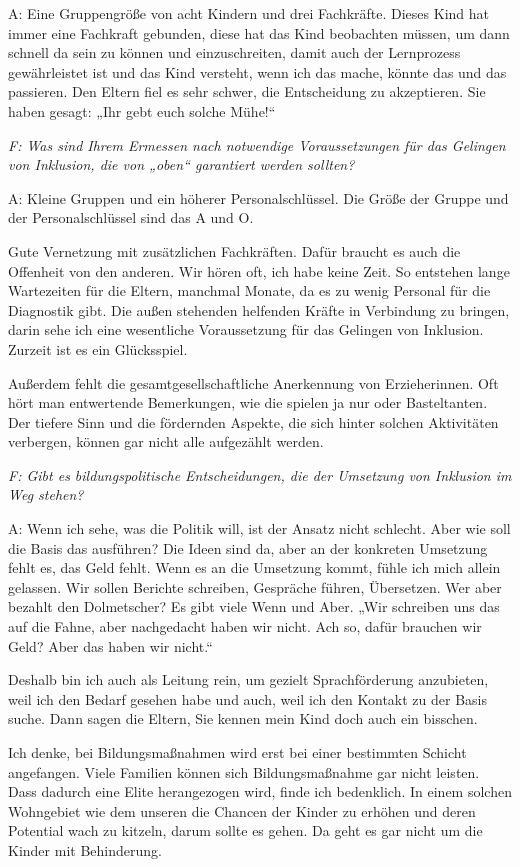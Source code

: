 A: Eine Gruppengröße von acht Kindern und drei Fachkräfte. Dieses Kind hat immer eine Fachkraft gebunden, diese hat das Kind beobachten müssen, um dann schnell da sein zu können und einzuschreiten, damit auch der Lernprozess gewährleistet ist und das Kind versteht, wenn ich das mache, könnte das und das passieren. Den Eltern fiel es sehr schwer, die Entscheidung zu akzeptieren. Sie haben gesagt: „Ihr gebt euch solche Mühe!“

\emph{F: Was sind Ihrem Ermessen nach notwendige Voraussetzungen für das Gelingen von Inklusion, die von „oben“ garantiert werden sollten?} 

A: Kleine Gruppen und ein höherer Personalschlüssel. Die Größe der Gruppe und der Personalschlüssel sind das A und O. 

Gute Vernetzung mit zusätzlichen Fachkräften. Dafür braucht es auch die Offenheit von den anderen. Wir hören oft, ich habe keine Zeit. So entstehen lange Wartezeiten für die Eltern, manchmal Monate, da es zu wenig Personal für die Diagnostik gibt. Die außen stehenden helfenden Kräfte in Verbindung zu bringen, darin sehe ich eine wesentliche Voraussetzung für das Gelingen von Inklusion. Zurzeit ist es ein Glücksspiel.

Außerdem fehlt die gesamtgesellschaftliche Anerkennung von Erzieherinnen. Oft hört man entwertende Bemerkungen, wie die spielen ja nur oder Basteltanten. Der tiefere Sinn und die fördernden Aspekte, die sich hinter solchen Aktivitäten verbergen, können gar nicht alle aufgezählt werden. 

\emph{F: Gibt es bildungspolitische Entscheidungen, die der Umsetzung von Inklusion im Weg stehen?} 

A: Wenn ich sehe, was die Politik will, ist der Ansatz nicht schlecht. Aber wie soll die Basis das ausführen? Die Ideen sind da, aber an der konkreten Umsetzung fehlt es, das Geld fehlt. Wenn es an die Umsetzung kommt, fühle ich mich allein gelassen. Wir sollen Berichte schreiben, Gespräche führen, Übersetzen. Wer aber bezahlt den Dolmetscher? 
Es gibt viele Wenn und Aber. „Wir schreiben uns das auf die Fahne, aber nachgedacht haben wir nicht. Ach so, dafür brauchen wir Geld? Aber das haben wir nicht.“ 

Deshalb bin ich auch als Leitung rein, um gezielt Sprachförderung anzubieten, weil ich den Bedarf gesehen habe und auch, weil ich den Kontakt zu der Basis suche. Dann sagen die Eltern, Sie kennen mein Kind doch auch ein bisschen. 

Ich denke, bei Bildungsmaßnahmen wird erst bei einer bestimmten Schicht angefangen. Viele Familien können sich Bildungsmaßnahme gar nicht leisten. Dass dadurch eine Elite herangezogen wird, finde ich bedenklich. In einem solchen Wohngebiet wie dem unseren die Chancen der Kinder zu erhöhen und deren Potential wach zu kitzeln, darum sollte es gehen. Da geht es gar nicht um die Kinder mit Behinderung. 

